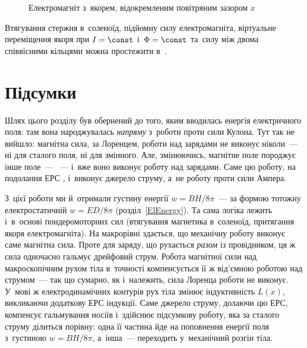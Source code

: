 \begin{figure}[h!]\centering
	\caption{Електромагніт з~якорем, відокремленим повітряним зазором $x$\label{pic:ElectromagnetForce}}
\end{figure}

\begin{Simulation}
Втягування стержня в~соленоїд, підйомну силу електромагніта, віртуальне переміщення якоря при $I=\const$ і~$\Phi=\const$ та~силу між двома співвісними кільцями можна простежити в~.
\end{Simulation}

\section*{Підсумки}
 {}

Шлях цього розділу був обернений до того, яким вводилась енергія електричного поля: там
вона народжувалась \emph{напряму} з~роботи проти сили Кулона. Тут так не вийшло: магнітна
сила, за Лоренцем, роботи над зарядами не виконує ніколи~--- ні для сталого поля, ні для
змінного. Але, змінюючись, магнітне поле породжує інше поле~--- ~--- і~вже воно виконує роботу над зарядами. Саме цю роботу, на подолання ЕРС
, і~виконує джерело струму, а~не роботу проти сили Ампера.

З~цієї роботи ми й~отримали густину енергії $w=BH/8\pi$~--- за формою тотожну
електростатичній $w=ED/8\pi$ (розділ~\ref{ElEnergy}). Та сама логіка лежить і~в~основі
пондеромоторних сил (втягування магнетика в~соленоїд, притягання якоря електромагніта). На
макрорівні здається, що механічну роботу виконує саме магнітна сила. Проте для заряду, що
рухається \emph{разом} із провідником, ця ж сила одночасно гальмує дрейфовий струм.
Робота магнітної сили над макроскопічним рухом тіла в~точності компенсується її ж
від'ємною роботою над струмом~--- так що сумарно, як і~належить, сила Лоренца роботи не
виконує. У~мові ж електродинамічних контурів рух тіла змінює індуктивність $L(x)$,
викликаючи додаткову ЕРС індукції. Саме джерело струму, долаючи цю ЕРС, компенсує
гальмування носіїв і~здійснює підсумкову роботу, яка за сталого струму ділиться порівну: одна її частина йде
на поповнення енергії поля з~густиною $w = BH/8\pi$, а~інша~--- переходить у~механічний
розгін тіла.

